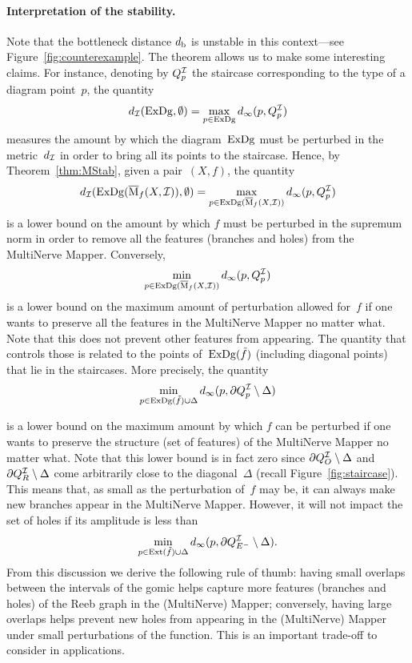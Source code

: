\paragraph*{Interpretation of the stability.} Note that the bottleneck distance $d_{\rm b}$ is unstable in this context---see Figure~\ref{fig:counterexample}. 
The theorem allows us to make some interesting claims. 
For instance, denoting by $Q_p^{\mathcal{I}}$ the staircase corresponding to the type of a diagram point~$p$,  the quantity 
%
\[
d_{\mathcal{I}}(\mathrm{ExDg}, \emptyset) = \max_{p\in \mathrm{ExDg}} d_\infty(p, Q_p^{\mathcal{I}}) 
\]
%
measures the amount by which the diagram~$\mathrm{ExDg}$ must be perturbed in the
metric~$d_{\mathcal{I}}$ in order to bring all its points to the staircase. Hence, by Theorem~\ref{thm:MStab}, given a pair~$(X,f)$, the quantity 
%
\[
d_{\mathcal{I}}(\mathrm{ExDg}(\overline{\mathrm{M}}_f(X,\mathcal{I})), \emptyset) = \max_{p\in \mathrm{ExDg}(\overline{\mathrm{M}}_f(X,\mathcal{I}))} d_\infty(p, Q_p^{\mathcal{I}}) 
\]
%
is a lower bound on the amount by which $f$ must be perturbed in
the supremum norm in order to remove all the features (branches and
holes) from the MultiNerve Mapper. Conversely, 
%
\[
\min_{p\in \mathrm{ExDg}(\overline{\mathrm{M}}_f(X,\mathcal{I}))} d_\infty(p, Q_p^{\mathcal{I}}) 
\]
%
is a lower bound on the maximum amount of perturbation allowed for~$f$
if one wants to preserve all the features in the MultiNerve
Mapper no matter what. Note that this does not prevent other features from
appearing. The quantity that controls those is related to the
points of~$\mathrm{ExDg}(\tilde f)$ (including 
diagonal points) that lie in the staircases. More precisely, the quantity
%
\[%
\min_{p\in \Dg(\tilde f) \cup \Delta} d_\infty(p, \partial Q_p^{\I}\setminus\Delta)
\]%

is a lower bound on the maximum amount by which $f$ can be perturbed
if one wants to preserve the structure (set of features) of the
MultiNerve Mapper no matter what. Note that this lower bound is
in fact zero since $\partial Q_O^{\mathcal{I}}\setminus\Delta$ and $\partial
Q_R^{\mathcal{I}}\setminus\Delta$ come arbitrarily close to the diagonal~$\Delta$
(recall Figure~\ref{fig:staircase}). This means that, as small as the
perturbation of~$f$ may be, it can always make new branches appear in
the MultiNerve Mapper. However, it will not impact the set of holes if
its amplitude is less than
%
\[
\min_{p\in \mathrm{Ext}(\tilde f) \cup \Delta} d_\infty(p, \partial Q_{E^-}^{\mathcal{I}}\setminus\Delta).
\]
%
From this discussion we derive the following rule of thumb: having
small overlaps between the intervals of the gomic helps capture more
features (branches and holes) of the Reeb graph in the (MultiNerve)
Mapper; conversely, having large overlaps helps prevent new holes from
appearing in the (MultiNerve) Mapper under small perturbations of the
function. This is an important trade-off to consider in applications.



